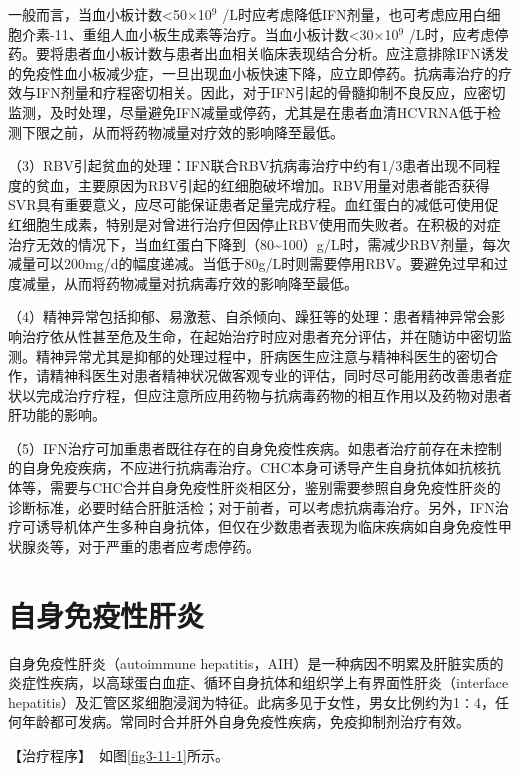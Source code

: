 一般而言，当血小板计数\textless{}50×10$^{9}$
/L时应考虑降低IFN剂量，也可考虑应用白细胞介素-11、重组人血小板生成素等治疗。当血小板计数\textless{}30×10$^{9}$
/L时，应考虑停药。要将患者血小板计数与患者出血相关临床表现结合分析。应注意排除IFN诱发的免疫性血小板减少症，一旦出现血小板快速下降，应立即停药。抗病毒治疗的疗效与IFN剂量和疗程密切相关。因此，对于IFN引起的骨髓抑制不良反应，应密切监测，及时处理，尽量避免IFN减量或停药，尤其是在患者血清HCVRNA低于检测下限之前，从而将药物减量对疗效的影响降至最低。

（3）RBV引起贫血的处理：IFN联合RBV抗病毒治疗中约有1/3患者出现不同程度的贫血，主要原因为RBV引起的红细胞破坏增加。RBV用量对患者能否获得SVR具有重要意义，应尽可能保证患者足量完成疗程。血红蛋白的减低可使用促红细胞生成素，特别是对曾进行治疗但因停止RBV使用而失败者。在积极的对症治疗无效的情况下，当血红蛋白下降到（80\textasciitilde{}100）g/L时，需减少RBV剂量，每次减量可以200mg/d的幅度递减。当低于80g/L时则需要停用RBV。要避免过早和过度减量，从而将药物减量对抗病毒疗效的影响降至最低。

（4）精神异常包括抑郁、易激惹、自杀倾向、躁狂等的处理：患者精神异常会影响治疗依从性甚至危及生命，在起始治疗时应对患者充分评估，并在随访中密切监测。精神异常尤其是抑郁的处理过程中，肝病医生应注意与精神科医生的密切合作，请精神科医生对患者精神状况做客观专业的评估，同时尽可能用药改善患者症状以完成治疗疗程，但应注意所应用药物与抗病毒药物的相互作用以及药物对患者肝功能的影响。

（5）IFN治疗可加重患者既往存在的自身免疫性疾病。如患者治疗前存在未控制的自身免疫疾病，不应进行抗病毒治疗。CHC本身可诱导产生自身抗体如抗核抗体等，需要与CHC合并自身免疫性肝炎相区分，鉴别需要参照自身免疫性肝炎的诊断标准，必要时结合肝脏活检；对于前者，可以考虑抗病毒治疗。另外，IFN治疗可诱导机体产生多种自身抗体，但仅在少数患者表现为临床疾病如自身免疫性甲状腺炎等，对于严重的患者应考虑停药。

\section{自身免疫性肝炎}

自身免疫性肝炎（autoimmune
hepatitis，AIH）是一种病因不明累及肝脏实质的炎症性疾病，以高球蛋白血症、循环自身抗体和组织学上有界面性肝炎（interface
hepatitis）及汇管区浆细胞浸润为特征。此病多见于女性，男女比例约为1∶4，任何年龄都可发病。常同时合并肝外自身免疫性疾病，免疫抑制剂治疗有效。

【治疗程序】　如图\ref{fig3-11-1}所示。


